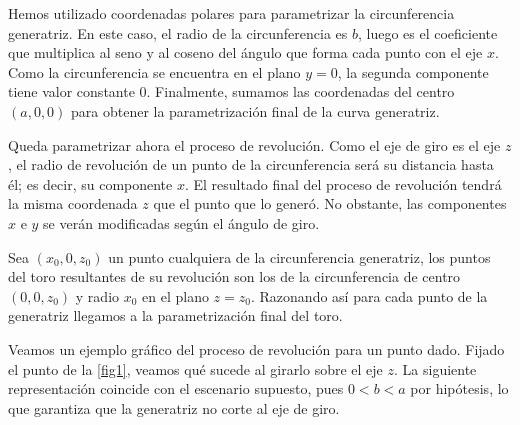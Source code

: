 \documentclass{article}
\begin{document}
Hemos utilizado coordenadas polares para parametrizar la circunferencia generatriz.
En este caso, el radio de la circunferencia es $b$, luego es el coeficiente que
multiplica al seno y al coseno del ángulo que forma cada punto con el eje $x$. Como la circunferencia
se encuentra en el plano $y = 0$, la segunda componente tiene valor constante $0$. Finalmente,
sumamos las coordenadas del centro $(a, 0, 0)$ para obtener la parametrización final de la 
curva generatriz. \vspace{1mm}

Queda parametrizar ahora el proceso de revolución. Como el eje de giro es el eje $z$, el radio
de revolución de un punto de la circunferencia será su distancia hasta él; es decir, su componente $x$.
El resultado final del proceso de revolución tendrá  la misma coordenada $z$ que el punto que lo generó.
No obstante, las componentes $x$ e $y$ se verán modificadas según el ángulo de giro.
\vspace{1mm}

Sea $(x_0, 0, z_0)$ un punto cualquiera de la circunferencia generatriz, los puntos del toro resultantes
de su revolución son los de la circunferencia de centro $(0,0,z_0)$ y radio $x_0$ en el plano $z = z_0$.
Razonando así para cada punto de la generatriz llegamos a la parametrización final del toro.

Veamos un ejemplo gráfico del proceso de revolución para un punto dado.
Fijado el punto de la \autoref{fig1}, veamos qué sucede al girarlo sobre el eje $z$.
La siguiente representación coincide con el escenario supuesto, pues $0 < b < a$ por hipótesis,
lo que garantiza que la generatriz no corte al eje de giro.

\newcommand{\mycircle}[3] %
{%
  \pgfmathsetmacro\vtheta{atan2(#2,#1)}                     %
  \pgfmathsetmacro\vphi  {acos(#3/sqrt(#1*#1+#2*#2+#3*#3))} %
  \begin{scope}[rotate around z=\vtheta,rotate around y=\vphi,canvas is xy plane at z=0]
    \draw (-0.5,-0.5) rectangle (0.5,0.5);
    \draw[fill=gray,fill opacity=0.2] (0,0) circle (0.5);   %
  \end{scope}
}
\end{document}
